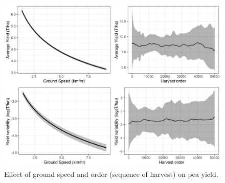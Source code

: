 \documentclass[]{elsarticle} %
\begin{document}
\begin{figure}
\includegraphics[width=1\linewidth]{../Figures/groundSpeed_peas} \caption{Effect of ground speed and order (sequence of harvest) on pea yield.}\label{fig:peasPlotSpeed}
\end{figure}
\end{document}
